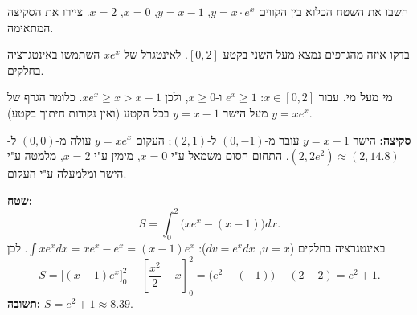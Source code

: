 
\begin{question}
חשבו את השטח הכלוא בין הקווים $y=x\cdot e^x$, $y=x-1$, $x=0$, $x=2$. ציירו את הסקיצה המתאימה.
\end{question}

\begin{hint}
בדקו איזה מהגרפים נמצא מעל השני בקטע $[0,2]$. לאינטגרל של $xe^x$ השתמשו באינטגרציה בחלקים.
\end{hint}

\begin{solution}
\textbf{מי מעל מי.} עבור $x\in[0,2]$: $e^x\ge1$ ו-$x\ge0$, ולכן $xe^x\ge x>x-1$. כלומר הגרף של $y=xe^x$ מעל הישר $y=x-1$ בכל הקטע (ואין נקודות חיתוך בקטע).

\textbf{סקיצה:} הישר $y=x-1$ עובר מ-$(0,-1)$ ל-$(2,1)$; העקום $y=xe^x$ עולה מ-$(0,0)$ ל-$(2,2e^2)\approx(2,14.8)$. התחום חסום משמאל ע"י $x=0$, מימין ע"י $x=2$, מלמטה ע"י הישר ומלמעלה ע"י העקום.

\textbf{שטח:}
\[
S=\int_0^2\big(xe^x-(x-1)\big)dx.
\]
באינטגרציה בחלקים ($u=x$, $dv=e^xdx$): $\int xe^xdx=xe^x-e^x=(x-1)e^x$. לכן
\[
S=\Big[(x-1)e^x\Big]_0^2-\left[\frac{x^2}{2}-x\right]_0^2=\big(e^2-(-1)\big)-(2-2)=e^2+1.
\]
\textbf{תשובה:} $S=e^2+1\approx8.39$.
\end{solution}
